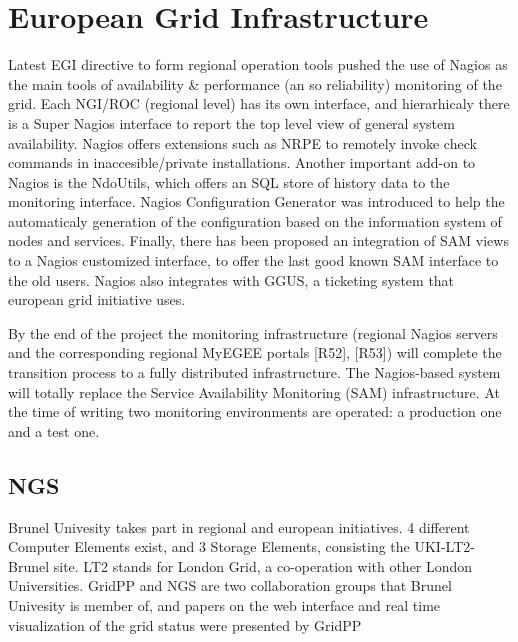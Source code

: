 \section{European Grid Infrastructure}
Latest EGI directive to form regional operation tools pushed the use of Nagios
\cite{imamagic2007grid} as the main tools of availability \& performance (an so
reliability) monitoring of the grid. Each NGI/ROC (regional level) has its own
interface, and hierarhicaly there is a Super Nagios interface to report the top
level view of general system availability. Nagios offers extensions such as NRPE
to remotely invoke check commands in inaccesible/private installations.
Another important add-on to Nagios is the NdoUtils, which offers an SQL store
of history data to the monitoring interface. Nagios Configuration Generator was
introduced to help the automaticaly generation of the configuration based on
the information system of nodes and services. Finally, there has been proposed
an integration of SAM views to a Nagios customized interface, to offer the last
good known SAM interface to the old users. Nagios also integrates with GGUS, a
ticketing system that european grid initiative uses.

By the end of the project the monitoring infrastructure (regional Nagios servers and the corresponding regional MyEGEE portals [R52], [R53]) will complete the transition process to a fully distributed infrastructure.
The Nagios-based system will totally replace the Service Availability Monitoring (SAM)
infrastructure. At the time of writing two monitoring environments are operated: a production one and a test one.
\newpage


\subsection{NGS}
Brunel Univesity takes part in regional and european initiatives. 4 different
Computer Elements exist, and 3 Storage Elements, consisting the UKI-LT2-Brunel
site. LT2 stands for London Grid, a co-operation with other London Universities.
GridPP and NGS are two collaboration groups that Brunel Univesity is member of,
and papers on the web interface \cite{Hobson2007} and real time visualization of
the grid status were presented \cite{Huang2007} by GridPP
